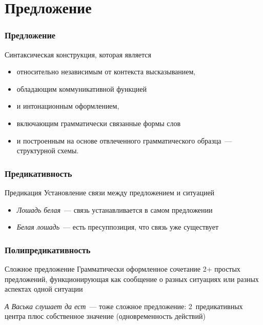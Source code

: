 \section{Предложение}
\frame{\tableofcontents[currentsection]}

\begin{frame}
  \frametitle{Предложение}

  Синтаксическая конструкция, которая является \begin{itemize}
    \item относительно независимым от контекста высказыванием,
    \item обладающим коммуникативной функцией
    \item и интонационным оформлением,
    \item включающим грамматически связанные формы слов
    \item и построенным на основе отвлеченного грамматического образца~--- структурной схемы.
  \end{itemize}
\end{frame}

\begin{frame}
  \frametitle{Предикативность}

  \begin{alertblock}{Предикация}
    Установление связи между предложением и ситуацией
  \end{alertblock}

  \vfill

  \begin{itemize}
    \item \textit{Лошадь белая}~--- связь устанавливается в самом предложении
    \item \textit{Белая лошадь}~--- есть пресуппозиция, что связь уже существует
  \end{itemize}
\end{frame}

\begin{frame}
  \frametitle{Полипредикативность}

  \begin{alertblock}{Сложное предложение}
    Грамматически оформленное сочетание 2+ простых предложений,
    функционирующая как сообщение о разных ситуациях или разных аспектах одной ситуации
  \end{alertblock}

  \textit{А Васька слушает да ест}~--- тоже сложное предложение: 2~предикативных центра плюс собственное значение (одновременность действий)
\end{frame}

